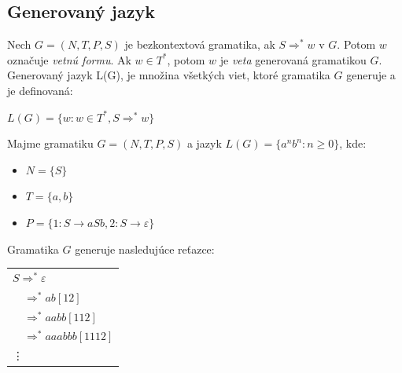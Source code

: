 \subsection{Generovaný jazyk}
Nech $G = (N, T, P, S)$ je bezkontextová gramatika, ak $S \Rightarrow^\ast w$ v $G$. Potom $w$ označuje \textit{vetnú formu}. Ak $w \in T^\ast$, potom $w$ je \textit{veta} generovaná gramatikou $G$. Generovaný jazyk L(G), je množina všetkých viet, ktoré gramatika $G$ generuje a je definovaná:
\begin{center}
$L(G) = \{w: w \in T^\ast, S \Rightarrow^\ast w\}$
\end{center}

\begin{theorem}
\normalfont Majme gramatiku $G = (N, T, P, S)$ a jazyk $L(G) = \{a^nb^n: n \geq 0 \}$, kde:
\begin{itemize}
\item $N = \{S\}$
\item $T = \{a,b\}$
\item $P = \{1: S \to aSb, 2: S \to \varepsilon\}$ 
\end{itemize} 
Gramatika $G$ generuje nasledujúce reťazce:
\begin{flushleft}
\begin{tabular}{p{10em}} 
$S \Rightarrow^\ast \varepsilon$\\
\item $ \quad \Rightarrow^\ast ab [12]$\\
\item $ \quad \Rightarrow^\ast aabb[112]$\\
\item $ \quad \Rightarrow^\ast aaabbb[1112]$\\
\item \quad\quad\quad\vdots
\end{tabular}
\end{flushleft}

\end{theorem}

